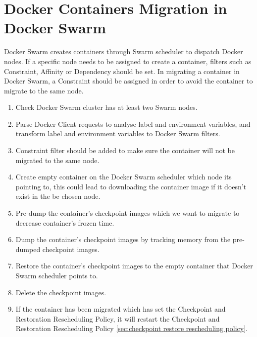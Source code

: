 \section{Docker Containers Migration in Docker Swarm}
Docker Swarm creates containers through Swarm scheduler to dispatch Docker nodes. If a specific node needs to be assigned to create a container, filters such as Constraint, Affinity or Dependency should be set.
In migrating a container in Docker Swarm, a Constraint should be assigned in order to avoid the container to migrate to the same node.
\begin{enumerate}[Step 1.]
	\item Check Docker Swarm cluster has at least two Swarm nodes.
    \item Parse Docker Client requests to analyse label and environment variables, and transform label and environment variables to Docker Swarm filters.
    \item Constraint filter should be added to make sure the container will not be migrated to the same node.
    \item Create empty container on the Docker Swarm scheduler which node its pointing to, this could lead to downloading the container image if it doesn't exist in the be chosen node.
    \item Pre-dump the container's checkpoint images which we want to migrate to decrease container's frozen time.
    \item Dump the container's checkpoint images by tracking memory from the pre-dumped checkpoint images.
    \item Restore the container's checkpoint images to the empty container that Docker Swarm scheduler points to.
    \item Delete the checkpoint images.
    \item If the container has been migrated which has set the Checkpoint and Restoration Rescheduling Policy, it will restart the Checkpoint and Restoration Rescheduling Policy \ref{sec:checkpoint restore rescheduling policy}.
\end{enumerate}
%
%

